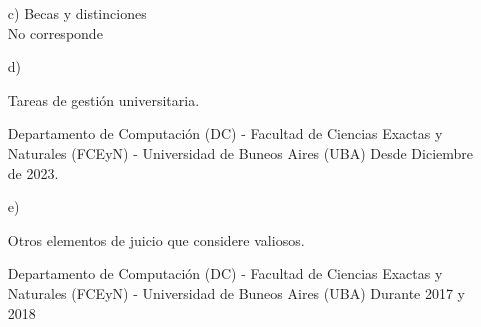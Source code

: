 \begin{enumerate}[leftmargin=0.8cm]
{    \begin{itemize}[leftmargin=0.2cm]
        \item[] \emph{Título}: El Gran Bache: La relación entre el enfoque didáctico y el entorno de programación en la enseñanza de la programación
        \item[] \emph{Director de tesis}: Dr. Christian Cossio Mercado
        \item[] \emph{Co-Director de tesis}: Dr. Agustín Adúriz Bravo
        \item[] \emph{Resumen}: Este trabajo busca analizar distintas herramientas y enfoques didácticos para la enseñanza de la programación en el nivel medio y cómo impacatan en el aprendizaje posterior de la programación en el nivel superior, poniendo especial énfasis en la transición entre entornos de programación visuales y lenguajes de programación textuales.
        \item[] \emph{Fecha de ingreso}: Cohorte 2022.
    \end{itemize}

  }

  \item[c)]{Becas y distinciones
    \\ No corresponde
  }

  \item[d)]{Tareas de gestión universitaria.

    \begin{itemize}[leftmargin=0.2cm]

      {Departamento de Computación (DC) - Facultad de Ciencias Exactas y Naturales (FCEyN) - Universidad de Buneos Aires (UBA)}
      {Desde Diciembre de 2023.}

    \end{itemize}

  }

  \item[e)]{Otros elementos de juicio que considere valiosos.
    \begin{itemize}[leftmargin=0.5cm]
    {Departamento de Computación (DC) - Facultad de Ciencias Exactas y Naturales (FCEyN) - Universidad de Buneos Aires (UBA)}
    {Durante 2017 y 2018}{}
    \end{itemize}
  }


\end{enumerate}
